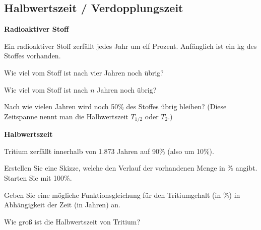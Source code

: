 
\subsection{Halbwertszeit / Verdopplungszeit}


\bbwActAufgabenNr{} \textbf{Radioaktiver Stoff}

Ein radioaktiver Stoff zerfällt jedes Jahr um elf Prozent. Anfänglich ist ein kg des Stoffes vorhanden.

\begin{bbwAufgabenBlock}
\item Wie viel vom Stoff ist nach vier Jahren noch übrig?
\item Wie viel vom Stoff ist nach $n$ Jahren noch übrig?
\item Nach wie vielen Jahren wird noch 50\% des Stoffes übrig bleiben?
  (Diese Zeitspanne nennt man die Halbwertszeit $T_{1/2}$ oder $T_2$.)
\end{bbwAufgabenBlock}
\platzFuerBerechnungenBisEndeSeite{}




\bbwActAufgabenNr{} \textbf{Halbwertszeit}

Tritium zerfällt innerhalb von 1.873 Jahren auf 90\%  (also um 10\%).


\begin{bbwAufgabenBlock}
\item Erstellen Sie eine Skizze, welche den Verlauf der vorhandenen
  Menge in \% angibt. Starten Sie mit 100\%.


\item Geben Sie eine mögliche Funktionsgleichung für den Tritiumgehalt
  (in \%)
  in Abhängigkeit der Zeit (in Jahren) an.

  
\item  
  Wie groß ist die Halbwertszeit von Tritium?

\end{bbwAufgabenBlock}
\platzFuerBerechnungenBisEndeSeite{}


